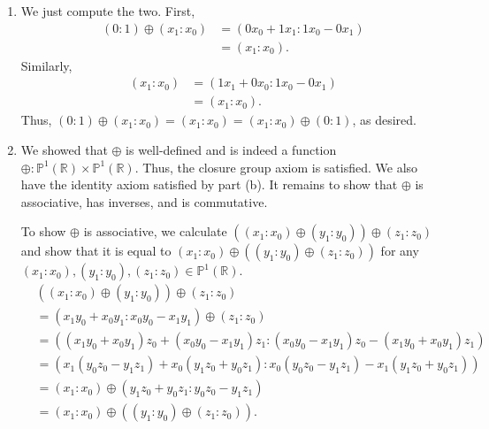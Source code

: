 \documentclass[12 pt, letterpaper]{hmcpset}
\begin{document}
\begin{solution}
\begin{enumerate}
			Now we compute
			\[
				\begin{split}
					(\alpha x_{1} : \alpha x_{0}) \oplus (\beta y_{1} : \beta y_{0}) & = (\alpha \beta (x_{1} y_{0} + x_{0} y_{1}) : \alpha \beta (x_{0} y_{0} - x_{1} y_{1})) \\
													 & = \alpha \beta (x_{1} y_{0} + x_{0} y_{1} : x_{0} y_{0} - x_{1} y_{1}) \\
													 & = (x_{1} y_{0} + x_{0} y_{1} : x_{0} y_{0} - x_{1} y_{1}) \\
													 & = (x_{1} : x_{0}) \oplus (y_{1} : y_{0}).
				\end{split}
			\]
			Thus, $\oplus$ is well-defined.
		\item We just compute the two. First,
			\[
				\begin{split}
					(0 : 1) \oplus (x_{1} : x_{0}) & = (0 x_{0} + 1 x_{1} : 1 x_{0} - 0 x_{1}) \\
								       & = (x_{1} : x_{0}).
				\end{split}
			\]
			Similarly,
			\[
				\begin{split}
					(x_{1} : x_{0}) & = (1 x_{1} + 0 x_{0} : 1 x_{0} - 0 x_{1}) \\
							& = (x_{1} : x_{0}).
				\end{split}
			\]
			Thus, $(0 : 1) \oplus (x_{1} : x_{0}) = (x_{1} : x_{0}) = (x_{1} : x_{0}) \oplus (0 : 1)$, as desired.
		\item We showed that $\oplus$ is well-defined and is indeed a function $\oplus : \mathbb{P}^{1}(\mathbb{R}) \times \mathbb{P}^{1}(\mathbb{R})$. Thus, the closure group axiom is satisfied. We also have the identity axiom satisfied by part (b). It remains to show that $\oplus$ is associative, has inverses, and is commutative.

			To show $\oplus$ is associative, we calculate $((x_{1} : x_{0}) \oplus (y_{1} : y_{0})) \oplus (z_{1} : z_{0})$ and show that it is equal to $(x_{1} : x_{0}) \oplus ((y_{1} : y_{0}) \oplus (z_{1} : z_{0}))$ for any $(x_{1} : x_{0}), (y_{1} : y_{0}), (z_{1} : z_{0}) \in \mathbb{P}^{1}(\mathbb{R})$.
			\[
				\begin{split}
					& ((x_{1} : x_{0}) \oplus (y_{1} : y_{0})) \oplus (z_{1} : z_{0}) \\ 
					& = (x_{1} y_{0} + x_{0} y_{1} : x_{0} y_{0} - x_{1} y_{1}) \oplus (z_{1} : z_{0}) \\
					& = ((x_{1} y_{0} + x_{0} y_{1}) z_{0} + (x_{0} y_{0} - x_{1} y_{1}) z_{1} : (x_{0} y_{0} - x_{1} y_{1}) z_{0} - (x_{1} y_{0} + x_{0} y_{1}) z_{1}) \\
					& = (x_{1} (y_{0} z_{0} - y_{1} z_{1}) + x_{0}(y_{1} z_{0} + y_{0} z_{1}) : x_{0}(y_{0} z_{0} - y_{1} z_{1}) - x_{1}(y_{1} z_{0} + y_{0} z_{1})) \\
					& = (x_{1} : x_{0}) \oplus (y_{1} z_{0} + y_{0} z_{1} : y_{0} z_{0} - y_{1} z_{1}) \\
					& = (x_{1} : x_{0}) \oplus ((y_{1} : y_{0}) \oplus (z_{1} : z_{0})).
				\end{split}
			\]


\end{enumerate}
\end{solution}
\end{document}

